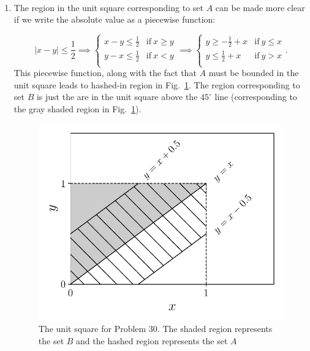 	
\begin{problem}{30} $ $
\begin{enumerate}
\item  The region in the unit square corresponding to set $A$ can be made more clear if we write the absolute value as a piecewise function:

\begin{equation*}
|x-y| \le \frac{1}{2} \implies
  \begin{cases}
                                   x-y \le \frac{1}{2} & \mathrm{if}~x \ge y \\
                                    y-x \le \frac{1}{2}  & \mathrm{if}~x<y \\

  \end{cases}
  \implies
  \begin{cases}
                                   y \ge - \frac{1}{2}+x & \mathrm{if}~y \le x \\
                                    y \le \frac{1}{2}+x  & \mathrm{if}~y>x \\

  \end{cases}.
\end{equation*}
This piecewise function, along with the fact that $A$ must be bounded in the unit square leads to hashed-in region in Fig.~\ref{fig:prob_30}.  The region corresponding to set $B$ is just the are in the unit square above the $45^\circ$ line (corresponding to the gray shaded region in Fig.~\ref{fig:prob_30}).

	\begin{figure}[t]
	\centering
      		 \includegraphics[totalheight=6cm]{chpt1/prob30.pdf}
  			  \caption{The unit square for Problem 30.  The shaded region represents the set $B$ and the hashed region represents the set $A$}
    			   \label{fig:prob_30}
	\end{figure}
	

\end{enumerate}
\end{problem}
